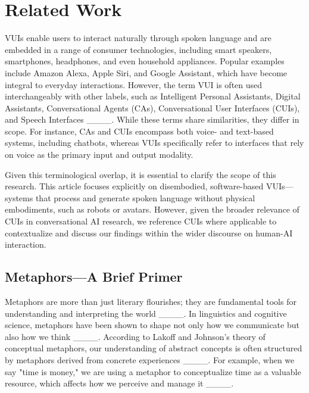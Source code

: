 \section{Related Work}
VUIs enable users to interact naturally through spoken language and are embedded in a range of consumer technologies, including smart speakers, smartphones, headphones, and even household appliances. Popular examples include Amazon Alexa, Apple Siri, and Google Assistant, which have become integral to everyday interactions. However, the term VUI is often used interchangeably with other labels, such as Intelligent Personal Assistants, Digital Assistants, Conversational Agents (CAs), Conversational User Interfaces (CUIs), and Speech Interfaces ____. While these terms share similarities, they differ in scope. For instance, CAs and CUIs encompass both voice- and text-based systems, including chatbots, whereas VUIs specifically refer to interfaces that rely on voice as the primary input and output modality.

Given this terminological overlap, it is essential to clarify the scope of this research. This article focuses explicitly on disembodied, software-based VUIs—systems that process and generate spoken language without physical embodiments, such as robots or avatars. However, given the broader relevance of CUIs in conversational AI research, we reference CUIs where applicable to contextualize and discuss our findings within the wider discourse on human-AI interaction.

\subsection{Metaphors—A Brief Primer}



Metaphors are more than just literary flourishes; they are fundamental tools for understanding and interpreting the world ____. In linguistics and cognitive science, metaphors have been shown to shape not only how we communicate but also how we think ____. According to Lakoff and Johnson's theory of conceptual metaphors, our understanding of abstract concepts is often structured by metaphors derived from concrete experiences ____. For example, when we say "time is money," we are using a metaphor to conceptualize time as a valuable resource, which affects how we perceive and manage it ____.

